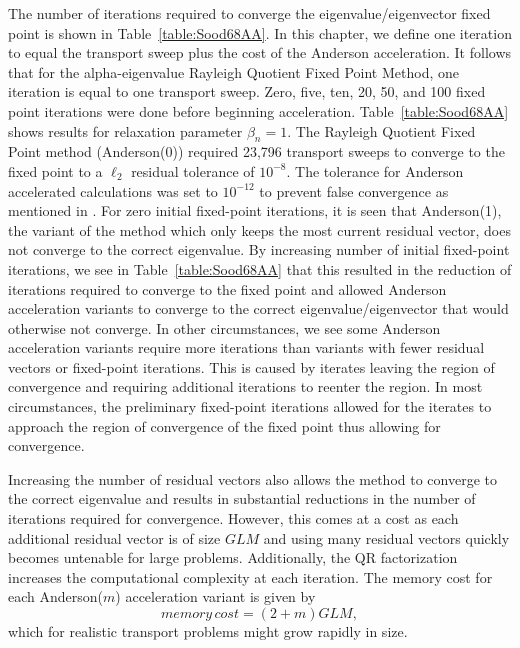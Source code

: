 The number of iterations required to converge the eigenvalue/eigenvector fixed point is shown in Table~\ref{table:Sood68AA}. In this chapter, we define one iteration to equal the transport sweep plus the cost of the Anderson acceleration. It follows that for the alpha-eigenvalue Rayleigh Quotient Fixed Point Method, one iteration is equal to one transport sweep. Zero, five, ten, 20, 50, and 100 fixed point iterations were done before beginning acceleration. Table~\ref{table:Sood68AA} shows results for relaxation parameter $\beta_{n} = 1$. The Rayleigh Quotient Fixed Point method (Anderson(0)) required 23,796 transport sweeps to converge to the fixed point to a $\ell_{2}$ residual tolerance of $10^{-8}$. The tolerance for Anderson accelerated calculations was set to $10^{-12}$ to prevent false convergence as mentioned in \cite{walker_anderson_2011}. For zero initial fixed-point iterations, it is seen that Anderson(1), the variant of the method which only keeps the most current residual vector, does not converge to the correct eigenvalue. By increasing number of initial fixed-point iterations, we see in Table~\ref{table:Sood68AA} that this resulted in the reduction of iterations required to converge to the fixed point and allowed Anderson acceleration variants to converge to the correct eigenvalue/eigenvector that would otherwise not converge. In other circumstances, we see some Anderson acceleration variants require more iterations than variants with fewer residual vectors or fixed-point iterations. This is caused by iterates leaving the region of convergence and requiring additional iterations to reenter the region. In most circumstances, the preliminary fixed-point iterations allowed for the iterates to approach the region of convergence of the fixed point thus allowing for convergence.

Increasing the number of residual vectors also allows the method to converge to the correct eigenvalue and results in substantial reductions in the number of iterations required for convergence. However, this comes at a cost as each additional residual vector is of size $GLM$ and using many residual vectors quickly becomes untenable for large problems. Additionally, the QR factorization increases the computational complexity at each iteration. The memory cost for each Anderson($m$) acceleration variant is given by
\begin{equation}
	memory\,cost = (2 + m)GLM,
\end{equation}
which for realistic transport problems might grow rapidly in size.

